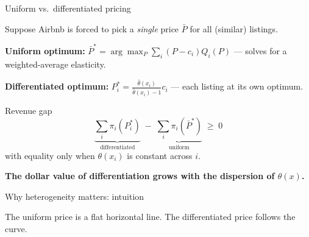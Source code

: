 \documentclass[aspectratio=169, 11pt, handout]{beamer}
\begin{document}
\begin{frame}{Uniform vs.\ differentiated pricing}

Suppose Airbnb is forced to pick a \emph{single} price $\bar P$ for all (similar) listings.
\vspace{0.4em}

\textbf{Uniform optimum:} $\bar P^* = \arg\max_{P} \sum_i (P - c_i) Q_i(P)$ --- solves for a weighted-average elasticity.
\vspace{0.4em}

\textbf{Differentiated optimum:} $P_i^* = \frac{\hat\theta(x_i)}{\hat\theta(x_i)-1} c_i$ --- each listing at its own optimum.
\vspace{0.6em}

\begin{alertblock}{Revenue gap}
\[
\underbrace{\sum_i \pi_i(P_i^*)}_{\text{differentiated}} \;-\; \underbrace{\sum_i \pi_i(\bar P^*)}_{\text{uniform}} \;\geq\; 0
\]
with equality only when $\theta(x_i)$ is constant across $i$.
\end{alertblock}
\vspace{0.4em}

\textbf{The dollar value of differentiation grows with the dispersion of $\theta(x)$.}
\end{frame}




\begin{frame}{Why heterogeneity matters: intuition}
\centering
{}
\vspace{0.4em}

The uniform price is a flat horizontal line. The differentiated price follows the curve.
\vspace{0.4em}

\end{frame}
\end{document}
